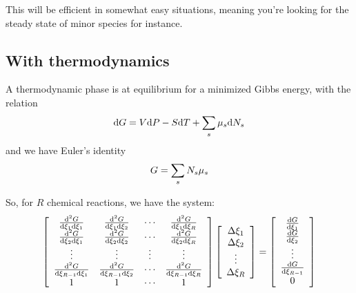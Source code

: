 This will be efficient in somewhat easy situations, meaning you're looking for the
steady state of minor species for instance.

\subsection{With thermodynamics}
A thermodynamic phase is at equilibrium for a minimized Gibbs energy, with
the relation
\begin{equation}
\dd\Gibbs = \Vol\dd\Press - \Entr\dd\Temp + \sum_s\chempot[s]\dd\Mol[s]
\end{equation}
and we have Euler's identity
\begin{equation}
\Gibbs = \sum_s \Mol[s]\chempot[s]
\end{equation}

So, for $R$ chemical reactions, we have the system:
\begin{equation}
\left[\begin{array}{cccc}
\ddoverddext{\Gibbs}{1}{1}   & \ddoverddext{\Gibbs}{1}{2}   & \cdots & \ddoverddext{\Gibbs}{1}{R} \\
\ddoverddext{\Gibbs}{2}{1}   & \ddoverddext{\Gibbs}{2}{2}   & \cdots & \ddoverddext{\Gibbs}{2}{R} \\
\vdots                       & \vdots                       & \vdots & \vdots                    \\
\ddoverddext{\Gibbs}{R-1}{1} & \ddoverddext{\Gibbs}{R-1}{2} & \cdots & \ddoverddext{\Gibbs}{R-1}{R} \\
1                            & 1                            & \cdots & 1\\
\end{array}\right]
\left[\begin{array}{c}
\Delta\ext[1]\\
\Delta\ext[2]\\
\vdots\\
\Delta\ext[R]\\
\end{array}\right]
=
\left[\begin{array}{c}
\doverdext[1]{\Gibbs}\\
\doverdext[2]{\Gibbs}\\
\vdots\\
\doverdext[R-1]{\Gibbs}\\
0
\end{array}\right]
\label{eq:matrixes_xi}
\end{equation}
